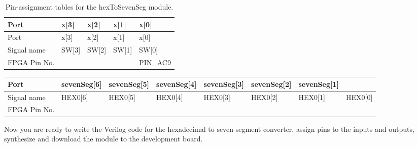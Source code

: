 \begin{longtable}[]{@{}
| >{\raggedright\arraybackslash}p{}|
  >{\raggedright\arraybackslash}p{}|
  >{\raggedright\arraybackslash}p{}|
  >{\raggedright\arraybackslash}p{}|
  >{\raggedright\arraybackslash}p{}|@{}}
\caption{Pin-assignment tables for the hexToSevenSeg module.}
\label{table:pinAssignmentHex2Seven}\tabularnewline
\toprule()
Port & x{[}3{]} & x{[}2{]} & x{[}1{]} & x{[}0{]} \\ \hline
\midrule()
\endfirsthead
\toprule()
Port & x{[}3{]} & x{[}2{]} & x{[}1{]} & x{[}0{]} \\ \hline
\midrule()
\endhead
Signal name & SW{[}3{]} & SW{[}2{]} & SW{[}1{]} & SW{[}0{]} \\ \hline
FPGA Pin No. & & & & PIN\_AC9 \\
\bottomrule()
\end{longtable}

\begin{longtable}[]{@{}
| >{\raggedright\arraybackslash}p{}|
  >{\raggedright\arraybackslash}p{}|
  >{\raggedright\arraybackslash}p{}|
  >{\raggedright\arraybackslash}p{}|
  >{\raggedright\arraybackslash}p{}|
  >{\raggedright\arraybackslash}p{}|
  >{\raggedright\arraybackslash}p{}|
  >{\raggedright\arraybackslash}p{}|@{}}
\toprule()
Port &
sevenSeg{[}6{]} &
sevenSeg{[}5{]} &
sevenSeg{[}4{]} &
sevenSeg{[}3{]} &
sevenSeg{[}2{]} &
sevenSeg{[}1{]} \\ \hline
\midrule()
\endhead
Signal name & HEX0{[}6{]} & HEX0{[}5{]} & HEX0{[}4{]} & HEX0{[}3{]} &
HEX0{[}2{]} & HEX0{[}1{]} & HEX0{[}0{]} \\ \hline
FPGA Pin No. & & & & & & & \\ \hline
\bottomrule()

\end{longtable}
Now you are ready to write the Verilog code for the hexadecimal to seven
segment converter, assign pins to the inputs and outputs, synthesize
and download the module to the development board.


